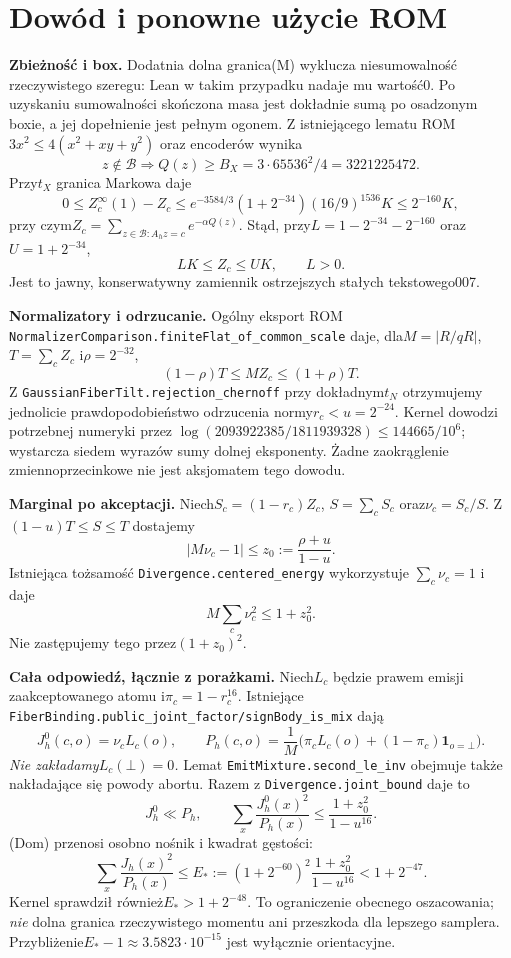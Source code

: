 \documentclass[11pt,a4paper]{article}
\newcommand{\code}[1]{\nolinkurl{#1}}
\begin{document}
\section{Dowód i ponowne użycie ROM}
\textbf{Zbieżność i box.}
Dodatnia dolna granica(M) wyklucza niesumowalność rzeczywistego szeregu:
Lean w takim przypadku nadaje mu wartość0. Po uzyskaniu sumowalności
skończona masa jest dokładnie sumą po osadzonym boxie, a jej dopełnienie
jest pełnym ogonem. Z istniejącego lematu ROM
$3x^2\le4(x^2+xy+y^2)$ oraz encoderów wynika
\[
 z\notin\mathcal B\Longrightarrow Q(z)\ge B_X=3\cdot65536^2/4=3221225472.
\]
Przy$t_X$ granica Markowa daje
\[
 0\le Z^\infty_c(1)-Z_c\le
 e^{-3584/3}(1+2^{-34})(16/9)^{1536}K\le2^{-160}K,
\]
przy czym$Z_c=\sum_{z\in\mathcal B:A_hz=c}e^{-\alpha Q(z)}$.
Stąd, przy$L=1-2^{-34}-2^{-160}$ oraz$U=1+2^{-34}$,
\[
 LK\le Z_c\le UK,\qquad L>0.
\]
Jest to jawny, konserwatywny zamiennik ostrzejszych stałych tekstowego007.

\textbf{Normalizatory i odrzucanie.}
Ogólny eksport ROM \code{NormalizerComparison.finiteFlat_of_common_scale}
daje, dla$M=|R/qR|$, $T=\sum_c Z_c$ i$\rho=2^{-32}$,
\[
 (1-\rho)T\le M Z_c\le(1+\rho)T.
\]
Z \code{GaussianFiberTilt.rejection_chernoff} przy dokładnym$t_N$ otrzymujemy
jednolicie prawdopodobieństwo odrzucenia normy$r_c<u=2^{-24}$.
Kernel dowodzi potrzebnej numeryki przez
$\log(2093922385/1811939328)\le144665/10^6$; wystarcza siedem wyrazów
sumy dolnej eksponenty. Żadne zaokrąglenie zmiennoprzecinkowe nie jest
aksjomatem tego dowodu.

\textbf{Marginal po akceptacji.}
Niech$S_c=(1-r_c)Z_c$, $S=\sum_c S_c$ oraz$\nu_c=S_c/S$.
Z$(1-u)T\le S\le T$ dostajemy
\[
 |M\nu_c-1|\le z_0:=\frac{\rho+u}{1-u}.
\]
Istniejąca tożsamość \code{Divergence.centered_energy} wykorzystuje
$\sum_c\nu_c=1$ i daje
\[
 M\sum_c\nu_c^2\le1+z_0^2.
\]
Nie zastępujemy tego przez$(1+z_0)^2$.

\textbf{Cała odpowiedź, łącznie z porażkami.}
Niech$L_c$ będzie prawem emisji zaakceptowanego atomu i$\pi_c=1-r_c^{16}$.
Istniejące \code{FiberBinding.public_joint_factor/signBody_is_mix} dają
\[
 J^0_h(c,o)=\nu_c L_c(o),\qquad
 P_h(c,o)=\frac1M\bigl(\pi_c L_c(o)+(1-\pi_c)\mathbf1_{o=\bot}\bigr).
\]
\emph{Nie zakładamy$L_c(\bot)=0$.} Lemat \code{EmitMixture.second_le_inv}
obejmuje także nakładające się powody abortu. Razem z
\code{Divergence.joint_bound} daje to
\[
 J^0_h\ll P_h,\qquad
 \sum_x\frac{J^0_h(x)^2}{P_h(x)}\le\frac{1+z_0^2}{1-u^{16}}.
\]
(Dom) przenosi osobno nośnik i kwadrat gęstości:
\[
 \sum_x\frac{J_h(x)^2}{P_h(x)}
 \le E_*:=(1+2^{-60})^2\frac{1+z_0^2}{1-u^{16}}<1+2^{-47}.
\]
Kernel sprawdził również$E_*>1+2^{-48}$. To ograniczenie obecnego
oszacowania; \emph{nie} dolna granica rzeczywistego momentu ani przeszkoda
dla lepszego samplera. Przybliżenie$E_*-1\approx3.5823\cdot10^{-15}$ jest
wyłącznie orientacyjne.
\end{document}
